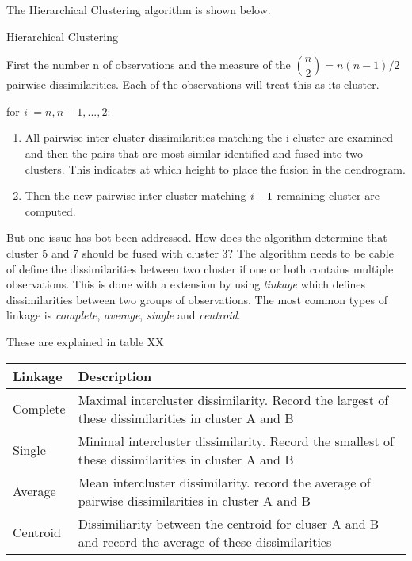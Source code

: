 The Hierarchical Clustering algorithm is shown below.

\begin{algorithm}
	\caption{Hierarchical Clustering}
	\label{algo:HierarchicalClustering}
	\begin{algorithmic}[1]
 		\State First the number n of observations and the measure of the $(\dfrac{n}{2}) =n(n-1)/2 $ pairwise dissimilarities. Each of the observations will treat this as its cluster.
 		
 		\State for \emph{i} $= n,n-1,...,2:$
 		\begin{enumerate}[label=(\alph*)]
 			\item All pairwise inter-cluster dissimilarities matching the i cluster are examined and then the pairs that are most similar identified and fused into two clusters. This indicates at which height to place the fusion in the dendrogram.
 			\item Then the new pairwise inter-cluster matching $\emph{i}-1$ remaining cluster are computed.
 		\end{enumerate}
 	\end{algorithmic}
 \end{algorithm}

But one issue has bot been addressed. How does the algorithm determine that cluster 5 and 7 should be fused with cluster 3? The algorithm needs to be cable of define the dissimilarities between two cluster if one or both contains multiple observations. This is done with a extension by using \emph{linkage} which defines dissimilarities between two groups of observations. The most common types of linkage is \emph{complete}, \emph{average}, \emph{single} and
\emph{centroid}.

These are explained in table XX
\begin{center}
	\begin{tabular}{ | l | p{12cm} |}
		\hline
		Linkage & Description \\ \hline
		Complete & Maximal intercluster dissimilarity. Record the largest of these dissimilarities in cluster A and B \\ \hline
		Single & Minimal intercluster dissimilarity. Record the smallest of these dissimilarities in cluster A and B \\ \hline
		Average & Mean intercluster dissimilarity. record the average of pairwise dissimilarities in cluster A and B\\
		\hline
		Centroid & Dissimiliarity between the centroid for cluser A and B and record the average of these dissimilarities
		\\
		\hline
	\end{tabular}
\end{center}

